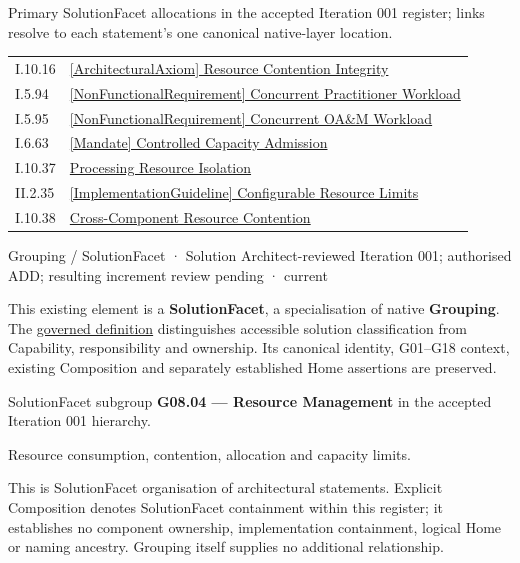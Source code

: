 Primary SolutionFacet allocations in the accepted Iteration 001 register; links resolve to each statement’s one canonical native-layer location.\par
\begin{longtable}{p{.22\linewidth}p{.73\linewidth}}
I.10.16 & \hyperref[element:db8d320dc4c0454080f8c0f3c4e52801]{[ArchitecturalAxiom] Resource Contention Integrity} \\
I.5.94 & \hyperref[element:e77f2e780a974dde99815ff63158941c]{[NonFunctionalRequirement] Concurrent Practitioner Workload} \\
I.5.95 & \hyperref[element:5220295ae5d144468066ae70683e0f19]{[NonFunctionalRequirement] Concurrent OA\&M Workload} \\
I.6.63 & \hyperref[element:fb30eb9b8a3c41eda3a8b5edfee95ac1]{[Mandate] Controlled Capacity Admission} \\
I.10.37 & \hyperref[element:41ce95e00e064d809ad4bda818705510]{Processing Resource Isolation} \\
II.2.35 & \hyperref[element:4621a5cb0dbe445488439ac03398a8b5]{[ImplementationGuideline] Configurable Resource Limits} \\
I.10.38 & \hyperref[element:5bd9cc19d41e47d49978afaeea8343ed]{Cross-Component Resource Contention} \\
\end{longtable}
\label{element:0e5030d90c134f1ea445257f0b6e788e}
{\small Grouping / SolutionFacet · Solution Architect-reviewed Iteration 001; authorised ADD; resulting increment review pending · current}\par

This existing element is a \textbf{SolutionFacet}, a specialisation of native
\textbf{Grouping}. The \href{\detokenize{../../../../../../../governance/continuum-representation.md#solutionfacet-classification--1119-candidate}}{governed definition}
distinguishes accessible solution classification from Capability, responsibility
and ownership. Its canonical identity, G01–G18 context, existing Composition
and separately established Home assertions are preserved.



SolutionFacet subgroup \textbf{G08.04 — Resource Management} in the accepted Iteration 001 hierarchy.



Resource consumption, contention, allocation and capacity limits.



This is SolutionFacet organisation of architectural statements. Explicit Composition denotes SolutionFacet containment within this register; it establishes no component ownership, implementation containment, logical Home or naming ancestry. Grouping itself supplies no additional relationship.


